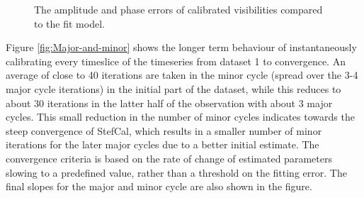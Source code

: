 \documentclass{aa}
\begin{document}
\begin{figure}[tbh]

\caption{\label{fig:The-model-amplitude}The amplitude and phase errors of
calibrated visibilities compared to the fit model. }
\end{figure}


Figure   \ref{fig:Major-and-minor}   shows   the   longer  term   behaviour   of
instantaneously calibrating every timeslice of  the timeseries from dataset 1 to
convergence. An average  of close to 40 iterations are taken  in the minor cycle
(spread over the 3-4 major cycle iterations) in the initial part of the dataset,
while this reduces to about 30  iterations in the latter half of the observation
with about  3 major cycles. This small  reduction in the number  of minor cycles
indicates towards the  steep convergence of StefCal, which  results in a smaller
number of  minor iterations for the later  major cycles due to  a better initial
estimate. The convergence  criteria is based on the rate  of change of estimated
parameters slowing to a predefined value, rather than a threshold on the fitting
error. The  final slopes for  the major  and minor cycle  are also shown  in the
figure.
\end{document}
